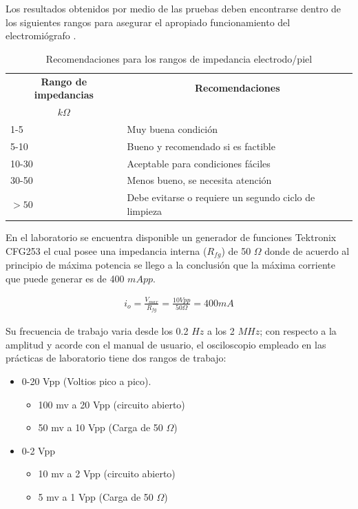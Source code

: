 
Los resultados obtenidos por medio de las pruebas deben encontrarse dentro de los siguientes rangos para asegurar el apropiado funcionamiento del electromiógrafo \cite{konrad2005abc}.

\begin{table}[H]
\centering
\caption{ Recomendaciones para los rangos de impedancia electrodo/piel \cite{konrad2005abc}}
\label{Rango impedancias}
\begin{tabular}{ll}
\hline
\multicolumn{1}{c}{\textbf{Rango de impedancias}}        & \multicolumn{1}{c}{\textbf{Recomendaciones}} \\ 
\multicolumn{1}{c}{\textbf{$k\Omega$}}                   &   \\ 
\hline \hline
1-5   & Muy buena condición  \\
5-10  & Bueno y recomendado si es factible \\
10-30 & Aceptable para condiciones fáciles \\
30-50 & Menos bueno, se necesita atención \\
$>50$ & Debe evitarse o requiere un segundo ciclo de limpieza \\
\hline
\end{tabular}
\end{table}

En el laboratorio se encuentra disponible un generador de funciones Tektronix CFG253 el cual posee una impedancia interna ($R_{fg}$) de 50 $\Omega$ donde de acuerdo al principio de máxima potencia se llego a la conclusión que la máxima corriente que puede generar es de 400 $mApp$.

\begin{align}\label{eq:eq2}
i_o=\frac{V_{max}}{R_{fg}}=\frac{10 Vpp}{50 \Omega}=400 mA
\end{align}

Su frecuencia de trabajo varia desde los 0.2 $Hz$ a los 2 $MHz$; con respecto a la amplitud y acorde con el manual de usuario, el osciloscopio empleado en las prácticas de laboratorio tiene dos rangos de trabajo:
      \begin{itemize}
      \item 0-20 Vpp (Voltios pico a pico).
        \begin{itemize}
          \item100 mv a 20 Vpp (circuito abierto)
          \item50 mv a 10 Vpp (Carga de 50 $\Omega$)
        \end{itemize}    
      \item 0-2 Vpp
        \begin{itemize}
          \item 10 mv a 2 Vpp (circuito abierto)
          \item 5 mv a 1 Vpp (Carga de 50 $\Omega$)
        \end{itemize}
      \end{itemize}   


